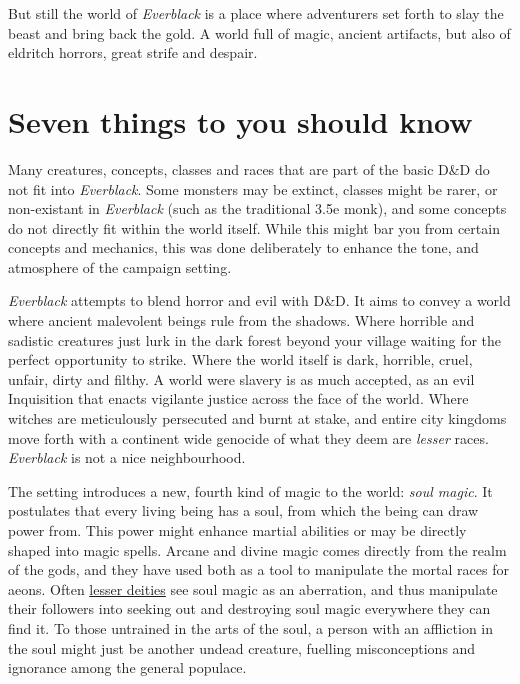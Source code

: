 But still the world of \emph{Everblack} is a place where adventurers set forth
to slay the beast and bring back the gold. A world full of magic, ancient
artifacts, but also of eldritch horrors, great strife and despair.

\section{Seven things to you should know}

\begin{enumerate}
  Many creatures, concepts, classes and
 races that are part of the basic D\&D do not fit into \emph{Everblack}. Some
 monsters may be extinct, classes might be rarer, or non-existant in
 \emph{Everblack} (such as the traditional 3.5e monk), and some concepts do not
 directly fit within the world itself. While this might bar you from certain
 concepts and mechanics, this was done deliberately to enhance the tone, and
 atmosphere of the campaign setting.

  \emph{Everblack} attempts to blend horror and evil with
 D\&D. It aims to convey a world where ancient malevolent beings rule from the
 shadows. Where horrible and sadistic creatures just lurk in the dark forest
 beyond your village waiting for the perfect opportunity to strike. Where the
 world itself is dark, horrible, cruel, unfair, dirty and filthy. A world were
 slavery is as much accepted, as an evil Inquisition that enacts vigilante
 justice across the face of the world. Where witches are meticulously
 persecuted and burnt at stake, and entire city kingdoms move forth with a
 continent wide genocide of what they deem are \emph{lesser} races.
 \emph{Everblack} is not a nice neighbourhood.

  The setting introduces a new, fourth kind of magic to the
 world: \emph{soul magic}. It postulates that every living being has a soul,
 from which the being can draw power from. This power might enhance martial
 abilities or may be directly shaped into magic spells. Arcane and divine
 magic comes directly from the realm of the gods, and they have used both as a
 tool to manipulate the mortal races for aeons. Often
 \hyperref[sec:Religion]{lesser deities} see soul magic as an aberration, and
 thus manipulate their followers into seeking out and destroying soul magic
 everywhere they can find it. To those untrained in the arts of the soul, a
 person with an affliction in the soul might just be another undead creature,
 fuelling misconceptions and ignorance among the general populace.


\end{enumerate}
